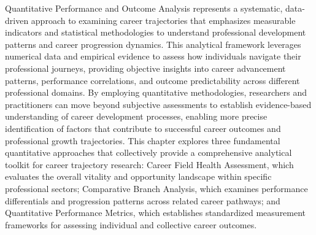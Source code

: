 \documentclass[./main.tex]{subfiles}
\begin{document}
Quantitative Performance and Outcome Analysis represents a systematic, data-driven approach to examining career trajectories that emphasizes measurable indicators and statistical methodologies to understand professional development patterns and career progression dynamics. This analytical framework leverages numerical data and empirical evidence to assess how individuals navigate their professional journeys, providing objective insights into career advancement patterns, performance correlations, and outcome predictability across different professional domains. By employing quantitative methodologies, researchers and practitioners can move beyond subjective assessments to establish evidence-based understanding of career development processes, enabling more precise identification of factors that contribute to successful career outcomes and professional growth trajectories. This chapter explores three fundamental quantitative approaches that collectively provide a comprehensive analytical toolkit for career trajectory research: Career Field Health Assessment, which evaluates the overall vitality and opportunity landscape within specific professional sectors; Comparative Branch Analysis, which examines performance differentials and progression patterns across related career pathways; and Quantitative Performance Metrics, which establishes standardized measurement frameworks for assessing individual and collective career outcomes.
\end{document}
